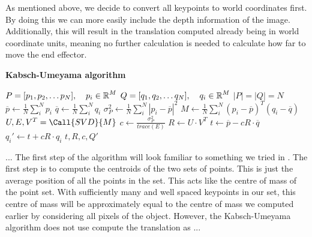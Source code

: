 As mentioned above, we decide to convert all keypoints to world coordinates first. By doing this we can more easily include the depth information of the image. Additionally, this will result in the translation computed already being in world coordinate units, meaning no further calculation is needed to calculate how far to move the end effector.\\

\begin{algorithm}
    \setlength{\baselineskip}{18pt}
    \caption{\textbf{Kabsch-Umeyama algorithm}}\label{alg:kabsch}
    \begin{algorithmic}[1]
        \Require $P = [p_1, p_2, \dots p_N], \operatorname{\: \: \: \:} p_i \in \operatorname{\mathbb{R}}^M$
        \Statex $Q = [q_1, q_2, \dots q_N], \operatorname{\: \: \: \:} q_i \in \operatorname{\mathbb{R}}^M$
        \Ensure $|P| = |Q| = N$
            \State $\overline{p} \gets \frac{1}{N}\sum^N_{i} p_i$
            \State $\overline{q} \gets \frac{1}{N}\sum^N_{i} q_i$
            \State $\sigma^2_P \gets \frac{1}{N}\sum^N_{i} |p_i - \overline{p}|^2$
            \State $M \gets \frac{1}{N}\sum^N_{i} (p_i - \overline{p})^T(q_i - \overline{q})$ 
            \State $U, E, V^T = \Call{SVD}{M}$ 
            \State $c \gets \frac{\sigma^2_P}{trace(E)}$
            \State $R \gets U \cdot V^T$
            \State $t \gets \overline{p} - cR \cdot \overline{q} $
                \State $q_i' \gets t + cR \cdot q_i$
            \EndFor
            \State \Output $t, R, c, Q'$
        \EndProcedure
        
    \end{algorithmic}
\end{algorithm}

...
The first step of the algorithm will look familiar to something we tried in . The first step is to compute the centroids of the two sets of points. This is just the average position of all the points in the set. This acts like the centre of mass of the point set. With sufficiently many and well spaced keypoints in our set, this centre of mass will be approximately equal to the centre of mass we computed earlier by considering all pixels of the object. However, the Kabsch-Umeyama algorithm does not use compute the translation as ... %

